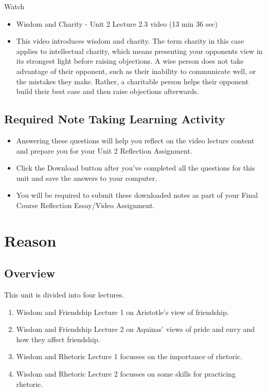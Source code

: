 \documentclass[
]{book}
\providecommand{\tightlist}{%
  \setlength{\itemsep}{0pt}\setlength{\parskip}{0pt}}
\begin{document}
Watch

\begin{itemize}
\tightlist
\item
  Wisdom and Charity - Unit 2 Lecture 2.3 video (13 min 36 sec)
\item
  This video introduces wisdom and charity. The term charity in this case applies to intellectual charity, which means presenting your opponents view in its strongest light before raising objections. A wise person does not take advantage of their opponent, such as their inability to communicate well, or the mistakes they make. Rather, a charitable person helps their opponent build their best case and then raise objections afterwards.
\end{itemize}

\hypertarget{required-note-taking-learning-activity-1}{%
\section*{Required Note Taking Learning Activity}\label{required-note-taking-learning-activity-1}}

\begin{itemize}
\tightlist
\item
  Answering these questions will help you reflect on the video lecture content and prepare you for your Unit 2 Reflection Assignment.
\item
  Click the Download button after you've completed all the questions for this unit and save the answers to your computer.
\item
  You will be required to submit these downloaded notes as part of your Final Course Reflection Essay/Video Assignment.
\end{itemize}

\hypertarget{reason}{%
\chapter{Reason}\label{reason}}

\hypertarget{overview-2}{%
\section*{Overview}\label{overview-2}}

This unit is divided into four lectures.

\begin{enumerate}
\def\labelenumi{\arabic{enumi}.}
\tightlist
\item
  Wisdom and Friendship Lecture 1 on Aristotle's view of friendship.
\item
  Wisdom and Friendship Lecture 2 on Aquinas' views of pride and envy and how they affect friendship.
\item
  Wisdom and Rhetoric Lecture 1 focusses on the importance of rhetoric.
\item
  Wisdom and Rhetoric Lecture 2 focusses on some skills for practicing rhetoric.
\end{enumerate}
\end{document}
